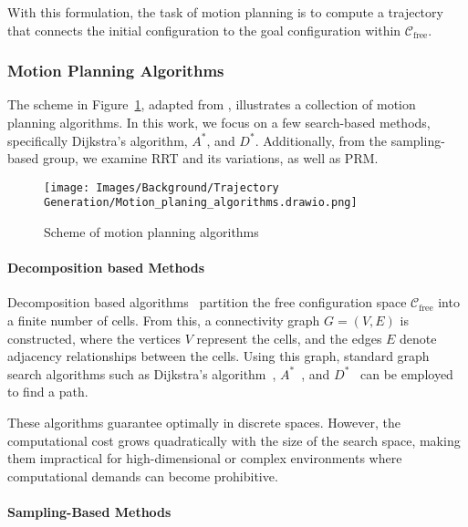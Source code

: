 With this formulation, the task of motion planning is to compute a trajectory that connects the initial configuration to the goal configuration within $\mathcal{C}_{\text{free}}$.

\subsubsection{Motion Planning Algorithms}

The scheme in Figure~\ref{fig:background:trajectory generation:motion planning algorithms}, adapted from \cite{InesBatista2022Thesis}, illustrates a collection of motion planning algorithms. In this work, we focus on a few search-based methods, specifically Dijkstra’s algorithm, $A^{*}$, and $D^{*}$. Additionally, from the sampling-based group, we examine RRT and its variations, as well as PRM.

\begin{figure}[H]
    \centering
    \texttt{[image: Images/Background/Trajectory Generation/Motion\_planing\_algorithms.drawio.png]}
    \caption{Scheme of motion planning algorithms~\cite{InesBatista2022Thesis}}
    \label{fig:background:trajectory generation:motion planning algorithms}
\end{figure}

\paragraph{Decomposition based Methods}

Decomposition based algorithms~\cite{latombe2012robot} partition the free configuration space $\mathcal{C}_{\text{free}}$ into a finite number of cells. From this, a connectivity graph $G = (V, E)$ is constructed, where the vertices $V$ represent the cells, and the edges $E$ denote adjacency relationships between the cells. Using this graph, standard graph search algorithms such as Dijkstra’s algorithm~\cite{dijkstra2022note}, $A^{*}$~\cite{hart1968formal}, and $D^{*}$~\cite{stentz1994optimal} can be employed to find a path.

These algorithms guarantee optimally in discrete spaces. However, the computational cost grows quadratically with the size of the search space, making them impractical for high-dimensional or complex environments where computational demands can become prohibitive.

\paragraph{Sampling-Based Methods}

